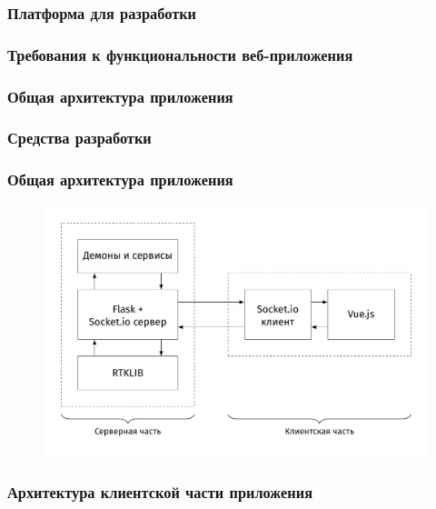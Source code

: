 \documentclass[xetex,t]{beamer}
\begin{document}
%
%
\begin{frame}
  \frametitle{Платформа для разработки}
\end{frame}


%
%
\begin{frame}
  \frametitle{Требования к функциональности веб-приложения}
\end{frame}


%
%
\begin{frame}
  \frametitle{Общая архитектура приложения}
\end{frame}


%
%
\begin{frame}
  \frametitle{Средства разработки}
\end{frame}


%
%
\begin{frame}
  \frametitle{Общая архитектура приложения}
  \vskip -0.75cm
  \begin{figure}[h]
    \centering
    \includegraphics[width=.95\textwidth]{../img/tikz/system-architecture/pic_sans_no-border}
  \end{figure}
\end{frame}


%
%
\begin{frame}
  \frametitle{Архитектура клиентской части приложения}
\end{frame}
\end{document}
